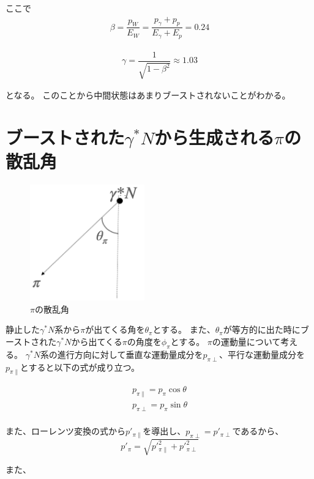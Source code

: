 ここで
\begin{eqnarray}
    \beta = \dfrac{p_W}{E_W} = \dfrac{p_\gamma + p_p}{E_\gamma + E_p} = 0.24
\end{eqnarray}

\begin{eqnarray}
    \gamma = \dfrac{1}{\sqrt{1 - \beta^2}} \approx 1.03
\end{eqnarray}

となる。
このことから中間状態はあまりブーストされないことがわかる。

\section{\texorpdfstring{ブーストされた$\gamma^* N$から生成される$\pi$の散乱角}{LG}}
\begin{figure}[H]
    \centering
    \includegraphics[height=5cm]{img/theta_pi.png}
    \caption{$\pi$の散乱角}
    \label{fig:angle7}
\end{figure}

静止した$\gamma^* N$系から$\pi$が出てくる角を$\theta_\pi$とする。
また、$\theta_\pi$が等方的に出た時にブーストされた$\gamma^* N$から出てくる$\pi$の角度を$\phi_\pi$とする。
$\pi$の運動量について考える。
$\gamma^* N$系の進行方向に対して垂直な運動量成分を$p_{\pi \perp}$、平行な運動量成分を$p_{\pi \parallel}$とすると以下の式が成り立つ。

\begin{eqnarray}
    p_{\pi \parallel} = p_\pi  \cos\theta \\
    p_{\pi \perp} = p_\pi \sin\theta \\
\end{eqnarray}

また、ローレンツ変換の式から$p'_{\pi \parallel}$を導出し、$p_{\pi \perp} = p'_{\pi \perp}$であるから、
\begin{equation}
    p'_\pi = \sqrt{p'^2_{\pi \parallel} + p'^2_{\pi \perp} }
\end{equation}

また、

